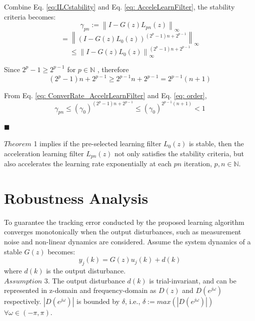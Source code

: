 \documentclass[a4paper, 12pt, twoside, openright]{mythesis}
\begin{document}
Combine Eq. \ref{eq:ILCstability} and Eq. \ref{eq: AcceleLearnFilter}, the stability criteria becomes:
\begin{equation}
\gamma_{pn} :=\left \| I-G(z)L_{pn}(z) \right \|_\infty
\end{equation}
\begin{equation}
=\left \| (I-G(z)L_0(z))^{(2^p-1)n+2^{p-1}} \right \|_\infty
\end{equation}
\begin{equation}
\leq \left \|I-G(z)L_0(z) \right \|_\infty ^{(2^p-1)n+2^{p-1}}
\label{eq: ConverRate_AccelrLearnFilter}
\end{equation}

Since $2^p-1\geq 2^{p-1}$ for $p\in\mathbb{N}$ , therefore
\begin{equation}
(2^p-1)n+2^{p-1}\geq 2^{p-1}n+2^{p-1}=2^{p-1}(n+1)
\label{eq: order}
\end{equation}

From Eq. \ref{eq: ConverRate_AccelrLearnFilter} and Eq. \ref{eq: order},
\begin{equation}
\gamma_{pn}\leq (\gamma_0)^{(2^p-1)n+2^{p-1}}\leq (\gamma_0)^{2^{p-1}(n+1)}<1
\end{equation}

\hfill$\blacksquare$

$Theorem$ 1 implies if the pre-selected learning filter $L_0(z)$ is stable, then the acceleration learning filter $L_{pn}(z)$ not only satisfies the stability criteria, but also accelerates the learning rate exponentially at each $pn$ iteration, $p, n\in\mathbb{N}$. 




\section{Robustness Analysis}
\label{sec: Robustness Analysis}


To guarantee the tracking error conducted by the proposed learning algorithm converges monotonically when the output disturbances, such as measurement noise and non-linear dynamics are considered. Assume the system dynamics of a stable $G(z)$ becomes:
\begin{equation}
y_j(k)=G(z)u_j(k)+d(k)
\label{eq:DynamicWithDisturb}
\end{equation}
where $d(k)$ is the output disturbance.\\

{$Assumption$ 3.}
The output disturbance $d(k)$ is trial-invariant, and can be represented in z-domain and frequency-domain as $D(z)$ and $D(e^{j\omega})$ respectively. $|D(e^{j\omega})|$ is bounded by $\delta$, i.e., $\delta:=max(|D(e^{j\omega})|)$ $\forall \omega\in(-\pi,\pi)$.
\end{document}
